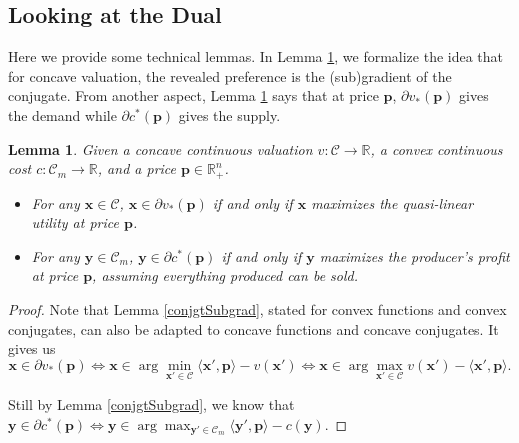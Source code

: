 \documentclass{article}
\newtheorem{lemma}{Lemma}[section]
\begin{document}
\subsection{Looking at the Dual}\label{SWMaxCommonSec}
Here we provide some technical lemmas. In Lemma \ref{conjgtSubgradInterp}, we formalize the idea that for concave valuation, the revealed preference is the (sub)gradient of the conjugate. From another aspect, Lemma \ref{conjgtSubgradInterp} says that at price $\mathbf{p}$, $\partial v_*(\mathbf{p})$ gives the demand while $\partial c^*(\mathbf{p})$ gives the supply.
\begin{lemma}\label{conjgtSubgradInterp}
    Given a concave continuous valuation $v:\mathcal{C}\to \mathbb{R}$, a convex continuous cost $c:\mathcal{C}_m\to \mathbb{R}$, and a price $\mathbf{p}\in \mathbb{R}_+^n$.
    \begin{itemize}
        \item For any $\mathbf{x}\in \mathcal{C}$, $\mathbf{x}\in\partial v_*(\mathbf{p})$ if and only if $\mathbf{x}$ maximizes the quasi-linear utility at price $\mathbf{p}$.
        \item For any $\mathbf{y}\in \mathcal{C}_m$, $\mathbf{y}\in\partial c^*(\mathbf{p})$ if and only if $\mathbf{y}$ maximizes the producer's profit at price $\mathbf{p}$, assuming everything produced can be sold.
    \end{itemize}
\end{lemma}
\begin{proof}
    Note that Lemma \ref{conjgtSubgrad}, stated for convex functions and convex conjugates, can also be adapted to concave functions and concave conjugates. It gives us
    \begin{equation*}
        \mathbf{x}\in\partial v_*(\mathbf{p})\iff \mathbf{x}\in\arg\min_{\mathbf{x}'\in \mathcal{C}}\langle \mathbf{x}',\mathbf{p}\rangle-v(\mathbf{x}')\iff\mathbf{x}\in\arg\max_{\mathbf{x}'\in \mathcal{C}}v(\mathbf{x}')-\langle \mathbf{x}',\mathbf{p}\rangle.
    \end{equation*}

    Still by Lemma \ref{conjgtSubgrad}, we know that $\mathbf{y}\in\partial c^*(\mathbf{p})\iff \mathbf{y}\in\arg\max_{\mathbf{y}'\in \mathcal{C}_m}\langle \mathbf{y}',\mathbf{p}\rangle-c(\mathbf{y})$.
\end{proof}
\end{document}
